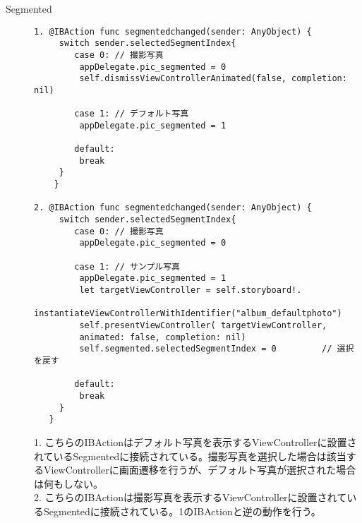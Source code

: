 \begin{description}
\item[Segmented]\mbox{} 
\begin{lstlisting}[basicstyle=\ttfamily\footnotesize, frame=single]
1. @IBAction func segmentedchanged(sender: AnyObject) {
     switch sender.selectedSegmentIndex{
        case 0: // 撮影写真
         appDelegate.pic_segmented = 0
         self.dismissViewControllerAnimated(false, completion: nil)
         
        case 1: // デフォルト写真
         appDelegate.pic_segmented = 1
         
        default:
         break
     }
    }

2. @IBAction func segmentedchanged(sender: AnyObject) {
     switch sender.selectedSegmentIndex{
        case 0: // 撮影写真
         appDelegate.pic_segmented = 0
            
        case 1: // サンプル写真
         appDelegate.pic_segmented = 1
         let targetViewController = self.storyboard!.
         instantiateViewControllerWithIdentifier("album_defaultphoto")
         self.presentViewController( targetViewController, 
         animated: false, completion: nil)
         self.segmented.selectedSegmentIndex = 0         // 選択を戻す
         
        default:
         break
     }
   }
\end{lstlisting}

1. こちらのIBActionはデフォルト写真を表示するViewControllerに設置されているSegmentedに接続されている。撮影写真を選択した場合は該当するViewControllerに画面遷移を行うが、デフォルト写真が選択された場合は何もしない。 \\
2. こちらのIBActionは撮影写真を表示するViewControllerに設置されているSegmentedに接続されている。1のIBActionと逆の動作を行う。 \\

\end{description}

